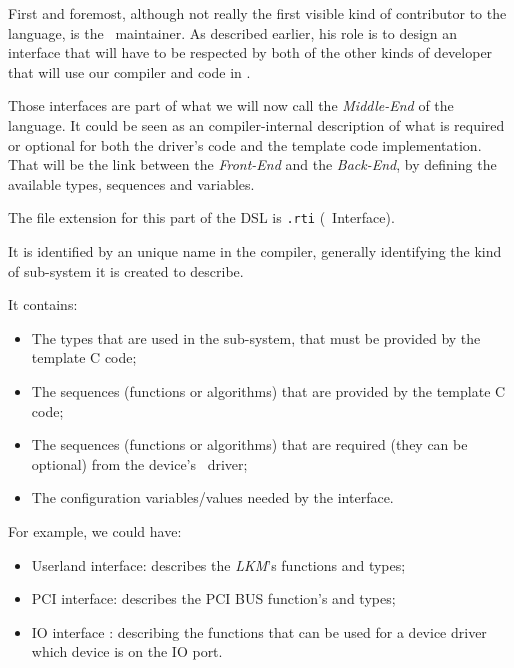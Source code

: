 \documentclass[american]{rtxreport}
\begin{document}
First and foremost, although not really the first visible kind of contributor
to the language, is the \rtx\ maintainer. As described earlier, his role is
to design an interface that will have to be respected by both of the other kinds
of developer that will use our compiler and code in \rtx.

Those interfaces are part of what we will now call the \emph{Middle-End} of the
language. It could be seen as an compiler-internal description of what is
required or optional for both the driver's code and the template code
implementation. That will be the link between the \emph{Front-End} and the
\emph{Back-End}, by defining the available types, sequences and variables.

The file extension for this part of the DSL is \texttt{.rti} (\rtx\ Interface).

It is identified by an unique name in the compiler, generally identifying the
kind of sub-system it is created to describe.

It contains:
\begin{itemize}
    \item The types that are used in the sub-system, that must be provided by
        the template C code;
    \item The sequences (functions or algorithms) that are provided by the
        template C code;
    \item The sequences (functions or algorithms) that are required
        (they can be optional) from the device's \rtx\ driver;
    \item The configuration variables/values needed by the interface.
\end{itemize}

For example, we could have:
\begin{itemize}
    \item Userland interface: describes the \emph{LKM}'s functions and types;
    \item PCI interface: describes the PCI BUS function's and types;
    \item IO interface : describing the functions that can be used
for a device driver which device is on the IO port.
\end{itemize}
\end{document}
